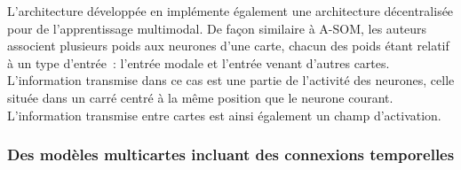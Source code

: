 \documentclass[../main]{subfiles}
\begin{document}
L'architecture développée en \cite{lefort_active_2015} implémente également une architecture décentralisée pour de l'apprentissage multimodal. De façon similaire à A-SOM, les auteurs associent plusieurs poids aux neurones d'une carte, chacun des poids étant relatif à un type d'entrée~: l'entrée modale et l'entrée venant d'autres cartes. L'information transmise dans ce cas est une partie de l'activité des neurones, celle située dans un carré centré à la même position que le neurone courant. L'information transmise entre cartes est ainsi également un champ d'activation.

\subsubsection{Des modèles multicartes incluant des connexions temporelles}
\end{document}
